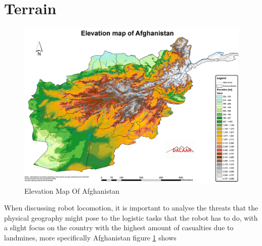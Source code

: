 \newpage
\section{Terrain}
\begin{figure}[!ht]
  \centering
  \includegraphics[width=\textwidth]{00 - Images/afghan-topography.png}
  \caption{Elevation Map Of Afghanistan \cite{afghan-topo}}
  \label{fig:af_elev}
\end{figure}

When discussing robot locomotion, it is important to analyse the threats that the physical geography might pose to the logistic tasks that the robot has to do, with a slight focus on the country with the highest amount of casualties due to landmines, more specifically Afghanistan figure \ref{fig:af_elev} shows  %


